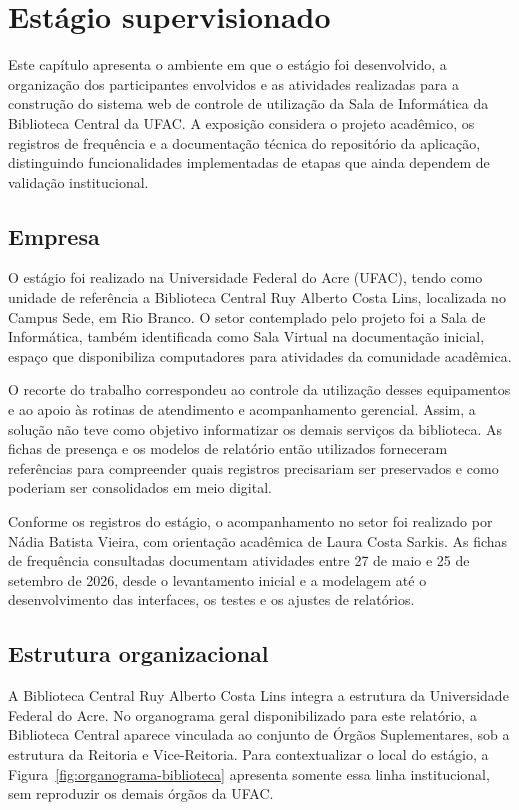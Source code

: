 \chapter{Estágio supervisionado}\label{cap:estagio}

Este capítulo apresenta o ambiente em que o estágio foi desenvolvido, a organização dos participantes envolvidos e as atividades realizadas para a construção do sistema web de controle de utilização da Sala de Informática da Biblioteca Central da UFAC. A exposição considera o projeto acadêmico, os registros de frequência e a documentação técnica do repositório da aplicação, distinguindo funcionalidades implementadas de etapas que ainda dependem de validação institucional.

\section{Empresa}\label{sec:empresa}

O estágio foi realizado na Universidade Federal do Acre (UFAC), tendo como unidade de referência a Biblioteca Central Ruy Alberto Costa Lins, localizada no Campus Sede, em Rio Branco. O setor contemplado pelo projeto foi a Sala de Informática, também identificada como Sala Virtual na documentação inicial, espaço que disponibiliza computadores para atividades da comunidade acadêmica.

O recorte do trabalho correspondeu ao controle da utilização desses equipamentos e ao apoio às rotinas de atendimento e acompanhamento gerencial. Assim, a solução não teve como objetivo informatizar os demais serviços da biblioteca. As fichas de presença e os modelos de relatório então utilizados forneceram referências para compreender quais registros precisariam ser preservados e como poderiam ser consolidados em meio digital.

Conforme os registros do estágio, o acompanhamento no setor foi realizado por Nádia Batista Vieira, com orientação acadêmica de Laura Costa Sarkis. As fichas de frequência consultadas documentam atividades entre 27 de maio e 25 de setembro de 2026, desde o levantamento inicial e a modelagem até o desenvolvimento das interfaces, os testes e os ajustes de relatórios.

\section{Estrutura organizacional}\label{sec:estrutura}

A Biblioteca Central Ruy Alberto Costa Lins integra a estrutura da Universidade Federal do Acre. No organograma geral disponibilizado para este relatório, a Biblioteca Central aparece vinculada ao conjunto de Órgãos Suplementares, sob a estrutura da Reitoria e Vice-Reitoria. Para contextualizar o local do estágio, a Figura~\ref{fig:organograma-biblioteca} apresenta somente essa linha institucional, sem reproduzir os demais órgãos da UFAC.

